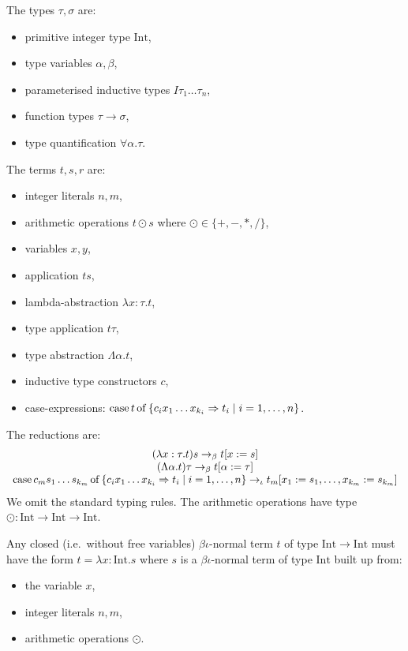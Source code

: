 \documentclass[
    9pt,            %
    techreport,        %
    affiltop,       %
]{art}
\begin{document}
\noindent The types $\tau,\sigma$ are:
\begin{itemize}
\item primitive integer type $\mathrm{Int}$,
\item type variables $\alpha,\beta$,
\item parameterised inductive types $I \tau_1 \ldots \tau_n$,
\item function types $\tau \to \sigma$,
\item type quantification $\forall \alpha . \tau$.
\end{itemize}
The terms $t,s,r$ are:
\begin{itemize}
\item integer literals $n, m$,
\item arithmetic operations $t \odot s$ where $\odot \in \{ {+}, {-}, {*}, {/} \}$,
\item variables $x,y$,
\item application $t s$,
\item lambda-abstraction $\lambda x : \tau . t$,
\item type application $t \tau$,
\item type abstraction $\Lambda \alpha . t$,
\item inductive type constructors $c$,
\item case-expressions: $\mathrm{case}\,t\,\mathrm{of}\,\{ c_i x_1 \ldots x_{k_i} \Rightarrow t_i \mid i = 1,\ldots,n\}$.
\end{itemize}
The reductions are:
\[
\begin{array}{c}
  (\lambda x : \tau . t) s \to_\beta t[x := s]\\
  (\Lambda \alpha . t) \tau \to_\beta t[\alpha := \tau]\\
  \mathrm{case}\,c_m s_1 \ldots s_{k_m}\,\mathrm{of}\,\{ c_i x_1 \ldots x_{k_i} \Rightarrow t_i \mid i = 1,\ldots,n\} \to_\iota t_m[x_1 := s_1,\ldots,x_{k_m} := s_{k_m}]
\end{array}
\]
We omit the standard typing rules. The arithmetic operations
have type $\odot : \mathrm{Int} \to \mathrm{Int} \to \mathrm{Int}$.

\begin{lemma}
  Any closed (i.e.~without free variables) $\beta\iota$-normal term
  $t$ of type $\mathrm{Int} \to \mathrm{Int}$ must have the form $t =
  \lambda x : \mathrm{Int} . s$ where $s$ is a $\beta\iota$-normal
  term of type $\mathrm{Int}$ built up from:
  \begin{itemize}
  \item the variable $x$,
  \item integer literals $n, m$,
  \item arithmetic operations $\odot$.
  \end{itemize}
\end{lemma}
\end{document}

